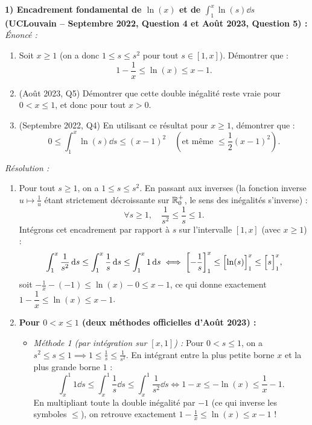 \begin{exemple}
\textbf{1) Encadrement fondamental de $\ln(x)$ et de $\int_1^x \ln(s)\dd s$ (UCLouvain -- Septembre 2022, Question 4 et Août 2023, Question 5) :}\\
\emph{Énoncé :}
\begin{enumerate}[label=(\alph*)]
    \item Soit $x \ge 1$ (on a donc $1 \le s \le s^2$ pour tout $s \in [1, x]$). Démontrer que :
    \[
        \boxed{1 - \frac{1}{x} \le \ln(x) \le x - 1}.
    \]
    \item (Août 2023, Q5) Démontrer que cette double inégalité reste vraie pour $0 < x \le 1$, et donc pour tout $x > 0$.
    \item (Septembre 2022, Q4) En utilisant ce résultat pour $x \ge 1$, démontrer que :
    \[
        \boxed{0 \le \int_1^x \ln(s)\dd s \le (x - 1)^2} \quad \left(\text{et même } \le \frac{1}{2}(x-1)^2\right).
    \]
\end{enumerate}
\emph{Résolution :}
\begin{enumerate}[label=(\alph*)]
    \item Pour tout $s \ge 1$, on a $1 \le s \le s^2$. En passant aux inverses (la fonction inverse $u \mapsto \frac{1}{u}$ étant strictement décroissante sur $\mathbb{R}_0^+$, le sens des inégalités s'inverse) :
    \[
        \forall s \ge 1, \quad \frac{1}{s^2} \le \frac{1}{s} \le 1.
    \]
    Intégrons cet encadrement par rapport à $s$ sur l'intervalle $[1, x]$ (avec $x \ge 1$) :
    \[
        \int_1^x \frac{1}{s^2}\,\mathrm{d} s \le \int_1^x \frac{1}{s}\,\mathrm{d} s \le \int_1^x 1\,\mathrm{d} s \iff \left[-\frac{1}{s}\right]_1^x \le \Bigl[\ln(s)\Bigr]_1^x \le \Bigl[s\Bigr]_1^x,
    \]
    soit $-\frac{1}{x} - (-1) \le \ln(x) - 0 \le x - 1$, ce qui donne exactement $1 - \dfrac{1}{x} \le \ln(x) \le x - 1$.
    \item \textbf{Pour $0 < x \le 1$ (deux méthodes officielles d'Août 2023) :}
    \begin{itemize}
        \item \emph{Méthode 1 (par intégration sur $[x, 1]$) :} Pour $0 < s \le 1$, on a $s^2 \le s \le 1 \implies 1 \le \frac{1}{s} \le \frac{1}{s^2}$. En intégrant entre la plus petite borne $x$ et la plus grande borne $1$ :
        \[
            \int_x^1 1\dd s \le \int_x^1 \frac{1}{s}\dd s \le \int_x^1 \frac{1}{s^2}\dd s \iff 1 - x \le -\ln(x) \le \frac{1}{x} - 1.
        \]
        En multipliant toute la double inégalité par $-1$ (ce qui inverse les symboles $\le$), on retrouve exactement $1 - \frac{1}{x} \le \ln(x) \le x - 1$ !

\end{itemize}
\end{enumerate}
\end{exemple}
